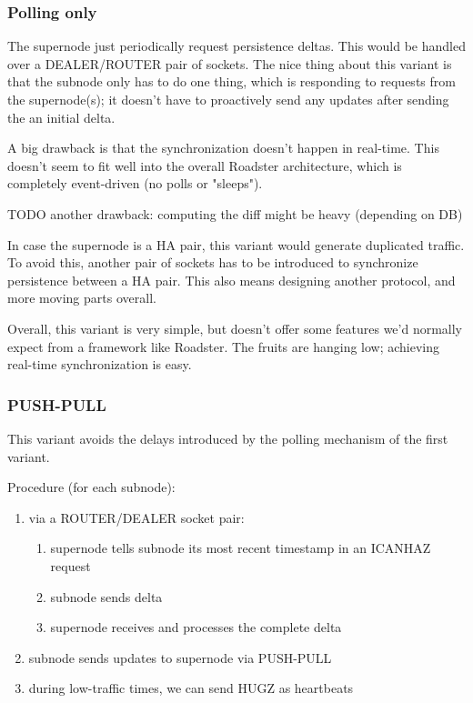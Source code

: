 \subsubsection{Polling only}
The supernode just periodically request persistence
deltas. This would be handled over a DEALER/ROUTER pair of sockets. The nice
thing about this variant is that the subnode only has to do one thing, which is
responding to requests from the supernode(s); it doesn't have to proactively
send any updates after sending the an initial delta.

A big drawback is that the synchronization doesn't happen in real-time. This
doesn't seem to fit well into the overall Roadster architecture, which is
completely event-driven (no polls or "sleeps").

TODO another drawback: computing the diff might be heavy (depending on DB)

In case the supernode is a HA pair, this variant would generate duplicated
traffic. To avoid this, another pair of sockets has to be introduced to
synchronize persistence between a HA pair. This also means designing another
protocol, and more moving parts overall.

Overall, this variant is very simple, but doesn't offer some features we'd
normally expect from a framework like Roadster. The fruits are hanging low;
achieving real-time synchronization is easy.

\subsubsection{PUSH-PULL}
This variant avoids the delays introduced by the polling mechanism of the first variant.

Procedure (for each subnode):
\begin{enumerate}
	\item via a ROUTER/DEALER socket pair:
		\begin{enumerate}
			\item supernode tells subnode its most recent timestamp in an ICANHAZ request
			\item subnode sends delta
			\item supernode receives and processes the complete delta
		\end{enumerate}
	\item subnode sends updates to supernode via PUSH-PULL
	\item during low-traffic times, we can send HUGZ as heartbeats
\end{enumerate}

